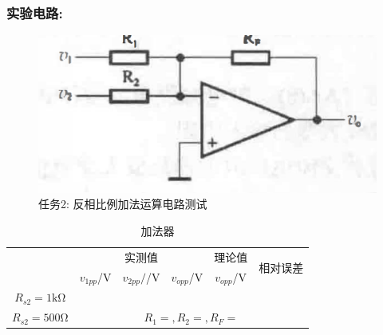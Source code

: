 \documentclass[a4paper,11pt,UTF8]{article}
\begin{document}
\subsubsection{实验电路:}
\begin{figure}[H]
	\centering
	\includegraphics[scale=0.2]{1.3}
	\caption*{任务2: 反相比例加法运算电路测试}
\end{figure}
\begin{table}[h]
	\centering
	\caption*{加法器}
	\label{table1}
	\begin{tabular}{|c|c|c|c|c|c|}
		\hline
		\multirow{2}{*}{}   & \multicolumn{3}{c|}{实测值} & 理论值 &
		\multirow{2}{*}{相对误差}\\
		\cline{2-5}
		\multirow{2}{*}{} & $v_{1pp}$/V & $v_{2pp}/$/V & $v_{opp}$/V & $v_{opp}$/V & \multirow{2}{*}{}\\
		\hline
		$R_{s2}=1\mathrm{k\Omega}$ & & & & &\\
		\hline
		$R_{s2}=500\mathrm{\Omega}$ & \multicolumn{5}{c|}{$R_1=,R_2=, R_F=$}\\
		\hline
	\end{tabular}
\end{table}
\end{document}

